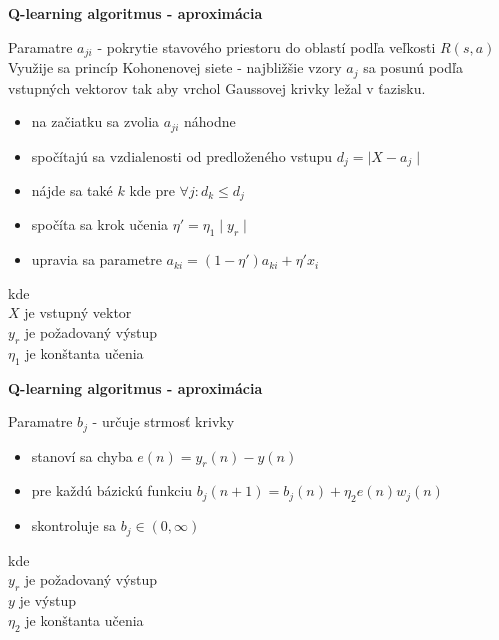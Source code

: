 \documentclass[xcolor=dvipsnames]{beamer}
\begin{document}
\begin{frame}{\bf Q-learning algoritmus - aproximácia}

Paramatre $a_{ji}$ - pokrytie stavového priestoru do oblastí podľa veľkosti $R(s, a)$
Využije sa princíp Kohonenovej siete - najbližšie vzory $a_j$ sa posunú podľa vstupných
vektorov tak aby vrchol Gaussovej krivky ležal v ťazisku.
\\
\begin{itemize}
\item na začiatku sa zvolia $a_{ji}$ náhodne
\item spočítajú sa vzdialenosti od predloženého vstupu $d_j = \mid X - a_{j} \mid$
\item nájde sa také $k$ kde pre $\forall{j} : d_k \leq d_j$
\item spočíta sa krok učenia $\eta' = \eta_1 \mid y_r \mid$
\item upravia sa parametre $a_{ki} = (1 - \eta')a_{ki} + \eta' x_{i}$
\end{itemize}

kde \\
$X$ je vstupný vektor \\
$y_r$ je požadovaný výstup \\
$\eta_1$ je konštanta učenia \\

\end{frame}

\begin{frame}{\bf Q-learning algoritmus - aproximácia}

Paramatre $b_{j}$ - určuje strmosť krivky

\begin{itemize}
\item stanoví sa chyba $e(n) = y_r(n) - y(n)$
\item pre každú bázickú funkciu  $b_j(n+1)= b_j(n) + \eta_2 e(n)w_j(n)$
\item skontroluje sa $b_j \in (0, \infty)$
\end{itemize}

kde \\
$y_r$ je požadovaný výstup \\
$y$ je výstup\\
$\eta_2$ je konštanta učenia \\

\end{frame}
\end{document}
